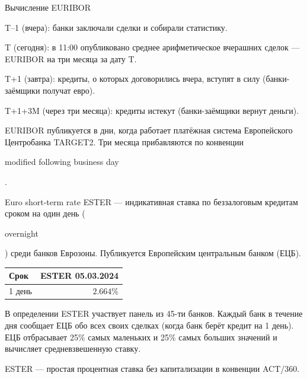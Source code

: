 \documentclass{beamer}
\newcommand{\en}[1]{\begin{otherlanguage}{english}#1\end{otherlanguage}}
\begin{document}
\begin{frame}{Вычисление EURIBOR}
\centering
{}
	
\justify
T--1 (вчера):  банки заключали сделки и собирали статистику.

T (сегодня): в 11:00 опубликовано среднее арифметическое вчерашних сделок --- EURIBOR на три месяца за дату T.

T+1 (завтра): кредиты, о которых договорились вчера, вступят в силу (банки-заёмщики получат евро).

T+1+3M (через три месяца): кредиты истекут (банки-заёмщики вернут деньги).

\justify
EURIBOR публикуется в дни, когда работает платёжная система Европейского Центробанка TARGET2. Три месяца прибавляются по конвенции \en{modified following business day}.
\end{frame}



\begin{frame}{Euro short-term rate}
\justify
\alert{ESTER} --- индикативная ставка по беззалоговым кредитам сроком на один день (\en{overnight}) среди банков Еврозоны. Публикуется Европейским центральным банком (ЕЦБ).

\justify
\centering
\begin{tabular}{l|r}
Срок   & ESTER 05.03.2024 \\ \hline
1 день & $2.664\%$
\end{tabular}

\justify
В определении ESTER участвует панель из 45-ти банков. Каждый банк в течение дня сообщает ЕЦБ обо всех своих сделках (когда банк берёт кредит на 1 день). ЕЦБ отбрасывает 25\% самых маленьких и 25\% самых больших значений и вычисляет средневзвешенную ставку.

\justify
ESTER --- простая процентная ставка без капитализации в конвенции ACT/360.
\end{frame}
\end{document}
